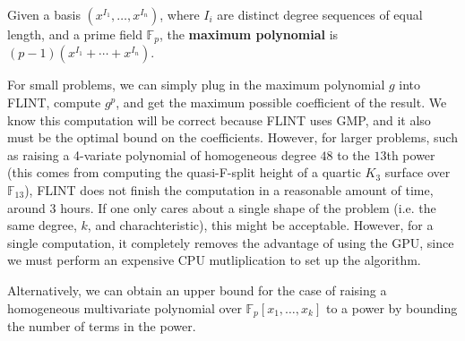 \begin{defn}
    Given a basis $(x^{I_1}, \dots, x^{I_n})$, where $I_i$ are distinct degree sequences of equal length, and a prime field $\mathbb{F}_p$, the \textbf{maximum polynomial} is $(p - 1)(x^{I_1} + \cdots + x^{I_n})$.
\end{defn}

For small problems, we can simply plug in the maximum polynomial $g$ into FLINT, compute $g ^ p$, and 
get the maximum possible coefficient of the result.
We know this computation will be correct because FLINT uses GMP,
and it also must be the optimal bound on the coefficients. 
However, for larger problems, such as raising a 4-variate polynomial of homogeneous degree $48$ to the $13$th power (this comes from computing the quasi-F-split height of a quartic $K_3$ surface over $\mathbb{F}_{13}$), FLINT does not finish the computation in a reasonable amount of time, around 3 hours.
If one only cares about a single shape of the problem (i.e. the same degree, \(k\), and charachteristic),
this might be acceptable.
However, for a single computation, it completely removes the advantage of using the GPU,
since we must perform an expensive CPU mutliplication to set up the algorithm.

Alternatively, we can obtain an upper bound for the case of raising a homogeneous multivariate polynomial over $\mathbb{F}_p[x_1, \dots , x_k]$ to a power
by bounding the number of terms in the power. 

%
%
%
%

